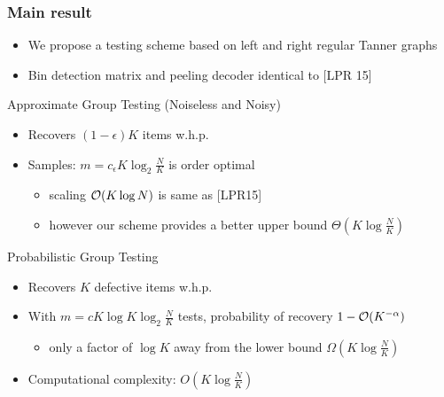 \begin{frame} \frametitle{Main result}
\begin{itemize}
\item We propose a testing scheme based on left and right regular Tanner graphs
\item Bin detection matrix and peeling decoder identical to [LPR 15]
\end{itemize}

\begin{block}{Approximate Group Testing (Noiseless and Noisy)}
\begin{itemize}
\item Recovers $(1-\epsilon)K$ items w.h.p.
\item Samples: $m = c_{\epsilon}K \log_2 \frac{N}{K}$ is order optimal
\begin{itemize}
\item scaling $\mathcal{O}(K \log N)$ is same as [LPR15]
\item however our scheme provides a better upper bound $\Theta(K\log\frac{N}{K})$
\end{itemize}
\end{itemize}
\end{block}

\pause
\begin{block}{Probabilistic Group Testing}
\begin{itemize}
\item Recovers $K$ defective items w.h.p.
\item With $m = cK \log K \log_2 \frac{N}{K}$ tests, probability of recovery $1-\mathcal{O}(K^{-\alpha})$
\begin{itemize}
\item only a factor of $\log K$ away from the lower bound $\Omega(K\log\frac{N}{K})$
\end{itemize}
\end{itemize}
\end{block}

\begin{itemize}
\item<3-> Computational complexity: $O(K \log \frac{N}{K})$
\end{itemize}
\end{frame}

